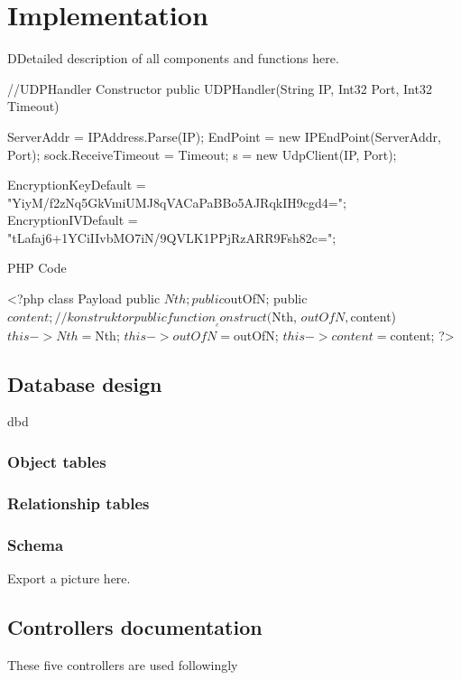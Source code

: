 \chapter{Implementation}
DDetailed description of all components and  functions here.  
\begin{csharpcode}
//UDPHandler Constructor 
public UDPHandler(String IP, Int32 Port, Int32 Timeout)
{
    ServerAddr = IPAddress.Parse(IP);
    EndPoint = new IPEndPoint(ServerAddr, Port);
    sock.ReceiveTimeout = Timeout;
    s = new UdpClient(IP, Port);
    
    EncryptionKeyDefault = "YiyM/f2zNq5GkVmiUMJ8qVACaPaBBo5AJRqkIH9cgd4=";
    EncryptionIVDefault = "tLafaj6+1YCiIIvbMO7iN/9QVLK1PPjRzARR9Fsh82c=";
}
\end{csharpcode}
PHP Code
\begin{phpcode}
<?php
class Payload
{
    public $Nth;
    public $outOfN;
    public $content;
    //konstruktor
    public function __construct($Nth, $outOfN, $content)
    {
        $this->Nth = $Nth;
        $this->outOfN = $outOfN;
        $this->content = $content;
    }
}
?>
\end{phpcode}

\section{Database design}
dbd
\subsection{Object tables}
\subsection{Relationship tables}
\subsection{Schema}
Export a picture here.
\section{Controllers documentation}
\par These five controllers are used followingly
